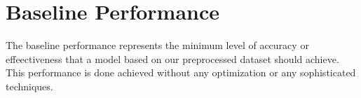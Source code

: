 \section{Baseline Performance}

\begin{fullwidth}
    The baseline performance represents the minimum level of accuracy or effeectiveness that a model based on our preprocessed dataset should achieve. 
    This performance is done achieved without any optimization or any sophisticated techniques.
    
\end{fullwidth}